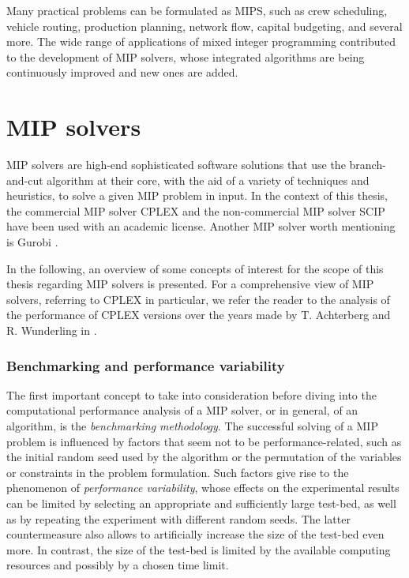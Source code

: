 Many practical problems can be formulated as MIPS, such as crew scheduling, vehicle routing, production planning, network flow, capital budgeting, and several more. The wide range of applications of mixed integer programming contributed to the development of MIP solvers, whose integrated algorithms are being continuously improved and new ones are added.

\section{MIP solvers} \label{sec:mipsolvers}
MIP solvers are high-end sophisticated software solutions that use the branch-and-cut algorithm at their core, with the aid of a variety of techniques and heuristics, to solve a given MIP problem in input. In the context of this thesis, the commercial MIP solver CPLEX \cite{cplex} and the non-commercial MIP solver SCIP \cite{scip} have been used with an academic license. Another MIP solver worth mentioning is Gurobi \cite{gurobi}. \par 

In the following, an overview of some concepts of interest for the scope of this thesis regarding MIP solvers is presented. For a comprehensive view of MIP solvers, referring to CPLEX in particular, we refer the reader to the analysis of the performance of CPLEX versions over the years made by T. Achterberg and R. Wunderling in \cite{achterberg2013}. \par

\subsubsection{Benchmarking and performance variability}
The first important concept to take into consideration before diving into the computational performance analysis of a MIP solver, or in general, of an algorithm, is the \textit{benchmarking methodology}. The successful solving of a MIP problem is influenced by factors that seem not to be performance-related, such as the initial random seed used by the algorithm or the permutation of the variables or constraints in the problem formulation. Such factors give rise to the phenomenon of \textit{performance variability}, whose effects on the experimental results can be limited by selecting an appropriate and sufficiently large test-bed, as well as by repeating the experiment with different random seeds. The latter countermeasure also allows to artificially increase the size of the test-bed even more. In contrast, the size of the test-bed is limited by the available computing resources and possibly by a chosen time limit. \par 

